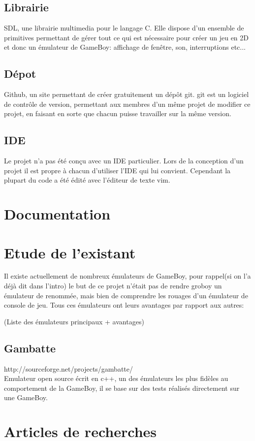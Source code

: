 \documentclass{report}
\begin{document}
\subsection{Librairie}
SDL, une librairie multimedia pour le langage C. Elle dispose d'un ensemble de primitives permettant de gérer tout ce qui est nécessaire pour créer un jeu en 2D et donc un émulateur de GameBoy: affichage de fenêtre, son, interruptions etc...

\subsection{Dépot}
Github, un site permettant de créer gratuitement un dépôt git. git est un logiciel de contrôle de version, permettant aux membres d'un même projet de modifier ce projet, en faisant en sorte que chacun puisse travailler sur la même version.

\subsection{IDE}
Le projet n'a pas été conçu avec un IDE particulier. Lors de la conception d'un projet il est propre à chacun d'utiliser l'IDE qui lui convient. Cependant la plupart du code a été édité avec l'éditeur de texte vim.
\section{Documentation}
\section{Etude de l'existant}
Il existe actuellement de nombreux émulateurs de GameBoy, pour rappel(si on l'a déjà dit dans l'intro) le but de ce projet n'était pas de rendre groboy un émulateur de renommée, mais bien de comprendre les rouages d'un émulateur de console de jeu.
Tous ces émulateurs ont leurs avantages par rapport aux autres:

(Liste des émulateurs principaux + avantages)
\subsection{Gambatte}
http://sourceforge.net/projects/gambatte/\\
Emulateur open source écrit en c++, un des émulateurs les plus fidèles au comportement de la GameBoy, il se base sur des tests réalisés directement sur une GameBoy.
\section{Articles de recherches}
\end{document}
